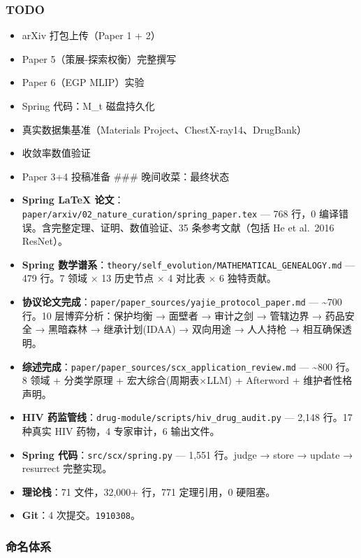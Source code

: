 \documentclass[
  12pt,
]{ctexart}
\begin{document}
\subsubsection{TODO}\label{todo}

\begin{itemize}
\item[$\square$]
  arXiv 打包上传（Paper 1 + 2）
\item[$\square$]
  Paper 5（策展-探索权衡）完整撰写
\item[$\square$]
  Paper 6（EGP MLIP）实验
\item[$\square$]
  Spring 代码：M\_t 磁盘持久化
\item[$\square$]
  真实数据集基准（Materials Project、ChestX-ray14、DrugBank）
\item[$\square$]
  收敛率数值验证
\item[$\square$]
  Paper 3+4 投稿准备 \#\#\# 晚间收菜：最终状态
\item
  \textbf{Spring LaTeX
  论文}：\texttt{paper/arxiv/02\_nature\_curation/spring\_paper.tex} ---
  768 行，0 编译错误。含完整定理、证明、数值验证、35 条参考文献（包括 He
  et al.~2016 ResNet）。
\item
  \textbf{Spring
  数学谱系}：\texttt{theory/self\_evolution/MATHEMATICAL\_GENEALOGY.md}
  --- 479 行。7 领域 × 13 历史节点 × 4 对比表 × 6 独特贡献。
\item
  \textbf{协议论文完成}：\texttt{paper/paper\_sources/yajie\_protocol\_paper.md}
  --- \textasciitilde700 行。10 层博弈分析：保护均衡 → 面壁者 → 审计之剑
  → 管辖边界 → 药品安全 → 黑暗森林 → 继承计划(IDAA) → 双向用途 →
  人人持枪 → 相互确保透明。
\item
  \textbf{综述完成}：\texttt{paper/paper\_sources/scx\_application\_review.md}
  --- \textasciitilde800 行。8 领域 + 分类学原理 + 宏大综合(周期表×LLM)
  + Afterword + 维护者性格声明。
\item
  \textbf{HIV
  药监管线}：\texttt{drug-module/scripts/hiv\_drug\_audit.py} --- 2,148
  行。17 种真实 HIV 药物，4 专家审计，6 输出文件。
\item
  \textbf{Spring 代码}：\texttt{src/scx/spring.py} --- 1,551 行。judge →
  store → update → resurrect 完整实现。
\item
  \textbf{理论栈}：71 文件，32,000+ 行，771 定理引用，0 硬阻塞。
\item
  \textbf{Git}：4 次提交。\texttt{1910308}。
\end{itemize}

\subsubsection{命名体系}\label{ux547dux540dux4f53ux7cfb}
\end{document}
